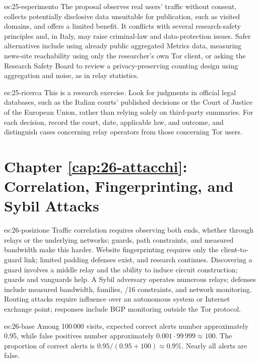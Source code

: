 \begin{soluzione}{es:25-esperimento}
The proposal observes real users' traffic without consent, collects potentially disclosive data unsuitable for publication, such as visited domains, and offers a limited benefit. It conflicts with several research-safety principles and, in Italy, may raise criminal-law and data-protection issues. Safer alternatives include using already public aggregated Metrics data, measuring news-site reachability using only the researcher's own Tor client, or asking the Research Safety Board to review a privacy-preserving counting design using aggregation and noise, as in relay statistics.
\end{soluzione}

\begin{soluzione}{es:25-ricerca}
This is a research exercise. Look for judgments in official legal databases, such as the Italian courts' published decisions or the Court of Justice of the European Union, rather than relying solely on third-party summaries. For each decision, record the court, date, applicable law, and outcome, and distinguish cases concerning relay operators from those concerning Tor users.
\end{soluzione}

\section*{Chapter \ref{cap:26-attacchi}: Correlation, Fingerprinting, and Sybil Attacks}

\begin{soluzione}{es:26-posizione}
Traffic correlation requires observing both ends, whether through relays or the underlying networks; guards, path constraints, and measured bandwidth make this harder. Website fingerprinting requires only the client-to-guard link; limited padding defenses exist, and research continues. Discovering a guard involves a middle relay and the ability to induce circuit construction; guards and vanguards help. A Sybil adversary operates numerous relays; defenses include measured bandwidth, families, /16 constraints, and network monitoring. Routing attacks require influence over an autonomous system or Internet exchange point; responses include BGP monitoring outside the Tor protocol.
\end{soluzione}

\begin{soluzione}{es:26-base}
Among 100\,000 visits, expected correct alerts number approximately 0.95, while false positives number approximately $0.001 \cdot 99\,999 \approx 100$. The proportion of correct alerts is $0.95/(0.95+100) \approx 0.9\%$. Nearly all alerts are false.
\end{soluzione}

